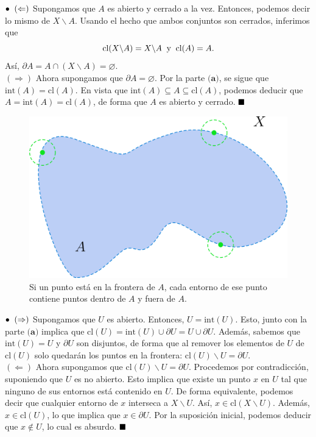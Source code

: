 \documentclass{article}
\begin{document}
$\bullet \hspace{0.2cm} (\Leftarrow)$ Supongamos que $A$ es abierto y cerrado a la vez. Entonces, podemos decir lo mismo de $X \backslash A$. Usando el hecho que ambos conjuntos son cerrados, inferimos que 
$$ \text{cl}(X \backslash A) = X \backslash A \hspace{0.2cm} \text{y} \hspace{0.2cm} \text{cl}(A) = A.$$
Así, $ \partial A = A \cap (X \backslash A) = \varnothing.$   \\
$(\Rightarrow)$ Ahora supongamos que $\partial A = \varnothing.$ Por la parte $\textbf{(a)}$, se sigue que $\text{int} (A) = \text{cl}(A)$. En vista que $\text{int}(A) \subseteq A \subseteq \text{cl}(A)$, podemos deducir que $A = \text{int}(A) = \text{cl}(A)$, de forma que $A$ es abierto y cerrado. $\hspace*{\fill} \blacksquare$ \\

\begin{figure}[h]
	\centering \includegraphics[scale=0.13]{e2fig2.png}
	\caption{Si un punto está en la frontera de $A$, cada entorno de ese punto contiene puntos dentro de $A$ y fuera de $A$. }
\end{figure}

$\bullet \hspace{0.2cm}  (\Rightarrow)$ Supongamos que $U$ es abierto. Entonces, $U = \text{int}(U)$. Esto, junto con la parte $\textbf{(a)}$ implica que $\text{cl}(U) = \text{int}(U) \cup \partial U = U \cup \partial U$.  Además, sabemos que $\text{int}(U) = U$ y $\partial U$ son disjuntos, de forma que al remover los elementos de $U$ de $\text{cl}(U)$ solo quedarán los puntos en la frontera: $\text{cl}(U) \backslash U = \partial U$. \\
$(\Leftarrow)$ Ahora supongamos que $\text{cl}(U) \backslash U = \partial U$. Procedemos por contradicción, suponiendo que $U$ es no abierto. Esto implica que existe un punto $x$ en $U$ tal que ninguno de sus entornos está contenido en $U$. De forma equivalente, podemos decir que cualquier entorno de $x$ interseca a $X \backslash U$. Así, $x \in \text{cl}(X \backslash U)$. Además, $x \in \text{cl}(U)$, lo que implica que $x \in \partial U$. Por la suposición inicial, podemos deducir que $x \notin U$, lo cual es absurdo. $\hspace*{\fill} \blacksquare$ \\
\end{document}
